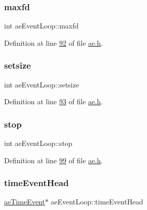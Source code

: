 \subsubsection{\texorpdfstring{maxfd}{maxfd}}
{\footnotesize\ttfamily int ae\+Event\+Loop\+::maxfd}



Definition at line \hyperlink{ae_8h_source_l00092}{92} of file \hyperlink{ae_8h_source}{ae.\+h}.

\mbox{\label{structaeEventLoop_a319d48af757c6f6144fa4066994f6541}} 
\subsubsection{\texorpdfstring{setsize}{setsize}}
{\footnotesize\ttfamily int ae\+Event\+Loop\+::setsize}



Definition at line \hyperlink{ae_8h_source_l00093}{93} of file \hyperlink{ae_8h_source}{ae.\+h}.

\mbox{\label{structaeEventLoop_a79b39021b2e805b8a547915d22279168}} 
\subsubsection{\texorpdfstring{stop}{stop}}
{\footnotesize\ttfamily int ae\+Event\+Loop\+::stop}



Definition at line \hyperlink{ae_8h_source_l00099}{99} of file \hyperlink{ae_8h_source}{ae.\+h}.

\mbox{\label{structaeEventLoop_a2c992f66acb2ba2d1d13890c55008788}} 
\subsubsection{\texorpdfstring{time\+Event\+Head}{timeEventHead}}
{\footnotesize\ttfamily \hyperlink{structaeTimeEvent}{ae\+Time\+Event}$\ast$ ae\+Event\+Loop\+::time\+Event\+Head}



